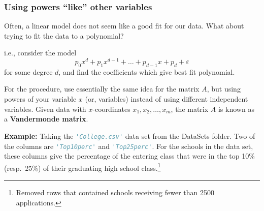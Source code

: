 \documentclass{beamer}
\theoremstyle{example}
\begin{document}
\begin{frame}
    \frametitle{Using powers ``like'' other variables}
    Often, a linear model does not seem like a good fit for our data. What about trying to fit the data to a polynomial?

    i.e., consider the model 
        \[p_0x^d + p_1x^{d-1} + \ldots + p_{d-1}x + p_d + \varepsilon\]
    for some degree $d$, and find the coefficients which give best fit polynomial.
    
    For the procedure, use essentially the same idea for the matrix $A$, but using powers of your variable $x$ (or, variables) instead of using different independent variables. Given data with $x$-coordinates $x_1,x_2,\ldots,x_m$, the matrix $A$ is known as a \textbf{Vandermonde matrix}.
    
        \pause
    \textbf{Example:} Taking the \lstinline[language=Python, stringstyle=\ttfamily\color{strings}]{'College.csv'} data set from the DataSets folder. Two of the columns are \lstinline[language=Python, stringstyle=\ttfamily\color{strings}]{'Top10perc'} and \lstinline[language=Python, stringstyle=\ttfamily\color{strings}]{'Top25perc'}. For the schools in the data set, these columns give the percentage of the entering class that were in the top 10\% (resp.\ 25\%) of their graduating high school class.\footnote{Removed rows that contained schools receiving fewer than 2500 applications.}
    
\end{frame}
\end{document}
